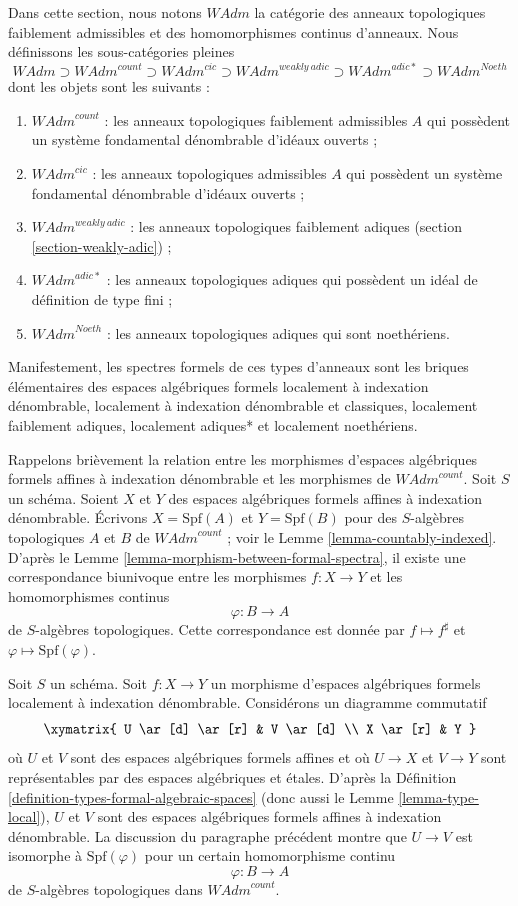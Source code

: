 \noindent
Dans cette section, nous notons $\textit{WAdm}$ la catégorie des
anneaux topologiques faiblement admissibles et des homomorphismes continus d'anneaux.
Nous définissons les sous-catégories pleines
$$
\textit{WAdm} \supset
\textit{WAdm}^{count} \supset
\textit{WAdm}^{cic} \supset
\textit{WAdm}^{weakly\ adic} \supset
\textit{WAdm}^{adic*} \supset
\textit{WAdm}^{Noeth}
$$
dont les objets sont les suivants :
\begin{enumerate}
\item $\textit{WAdm}^{count}$ : les anneaux topologiques faiblement admissibles
$A$ qui possèdent un système fondamental dénombrable d'idéaux ouverts ;
\item $\textit{WAdm}^{cic}$ : les anneaux topologiques admissibles
$A$ qui possèdent un système fondamental dénombrable d'idéaux ouverts ;
\item $\textit{WAdm}^{weakly\ adic}$ : les anneaux topologiques faiblement adiques
(section \ref{section-weakly-adic}) ;
\item $\textit{WAdm}^{adic*}$ : les anneaux topologiques adiques qui possèdent
un idéal de définition de type fini ;
\item $\textit{WAdm}^{Noeth}$ : les anneaux topologiques adiques qui
sont noethériens.
\end{enumerate}
Manifestement, les spectres formels de ces types d'anneaux sont les briques
élémentaires des espaces algébriques formels
localement à indexation dénombrable,
localement à indexation dénombrable et classiques,
localement faiblement adiques,
localement adiques* et
localement noethériens.

\medskip\noindent
Rappelons brièvement la relation entre les morphismes d'espaces algébriques
formels affines à indexation dénombrable et les
morphismes de $\textit{WAdm}^{count}$.
Soit $S$ un schéma. Soient $X$ et $Y$ des espaces algébriques formels
affines à indexation dénombrable. Écrivons $X = \text{Spf}(A)$
et $Y = \text{Spf}(B)$ pour des $S$-algèbres topologiques
$A$ et $B$ de $\textit{WAdm}^{count}$ ; voir le
Lemme \ref{lemma-countably-indexed}.
D'après le Lemme \ref{lemma-morphism-between-formal-spectra},
il existe une correspondance biunivoque entre les morphismes
$f : X \to Y$ et les homomorphismes continus
$$
\varphi : B \longrightarrow A
$$
de $S$-algèbres topologiques. Cette correspondance est donnée par
$f \mapsto f^\sharp$ et $\varphi \mapsto \text{Spf}(\varphi)$.

\medskip\noindent
Soit $S$ un schéma. Soit $f : X \to Y$ un morphisme d'espaces algébriques
formels localement à indexation dénombrable. Considérons un
diagramme commutatif
$$
\xymatrix{
U \ar[d] \ar[r] & V \ar[d] \\
X \ar[r] & Y
}
$$
où $U$ et $V$ sont des espaces algébriques formels affines et où $U \to X$ et $V \to Y$
sont représentables par des espaces algébriques et étales. D'après la
Définition \ref{definition-types-formal-algebraic-spaces} (donc aussi le
Lemme \ref{lemma-type-local}), $U$ et $V$ sont des espaces algébriques formels
affines à indexation dénombrable. La discussion du paragraphe
précédent montre que $U \to V$ est isomorphe à $\text{Spf}(\varphi)$
pour un certain homomorphisme continu
$$
\varphi : B \longrightarrow A
$$
de $S$-algèbres topologiques dans $\textit{WAdm}^{count}$.

